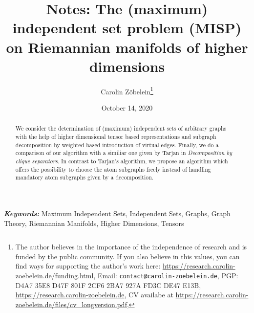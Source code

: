 \documentclass{article}
\newtheorem*{theorem A}{Theorem A}
\newtheorem*{theorem B}{N\"olker's Theorem}
\theoremstyle{remark}
\theoremstyle{remark}
\begin{document}
\title{Notes: The (maximum) independent set problem (MISP) on Riemannian manifolds of higher dimensions}
\author{Carolin Z\"obelein\thanks{The author believes in the importance of the independence of research and is funded by the public community. If you also believe in this values, you can find ways for supporting the author's work here: \url{https://research.carolin-zoebelein.de/funding.html}, Email: \href{mailto:contact@carolin-zoebelein.de}{\texttt{contact@carolin-zoebelein.de}}, PGP: D4A7 35E8 D47F 801F 2CF6 2BA7 927A FD3C DE47 E13B, \url{https://research.carolin-zoebelein.de}, CV availabe at \url{https://research.carolin-zoebelein.de/files/cv_longversion.pdf}, \Cooley}}
\date{October 14, 2020}   %
\maketitle
\begin{abstract}
    We consider the determination of (maximum) independent sets of arbitrary graphs with the help of higher dimensional tensor based representations and subgraph decomposition by weighted based introduction of virtual edges. Finally, we do a comparison of our algorithm with a similiar one given by Tarjan in \textit{Decomposition by clique separators}. In contrast to Tarjan's algorithm, we propose an algorithm which offers the possibility to choose the atom subgraphs freely instead of handling mandatory atom subgraphs given by a decomposition.
\end{abstract}
\providecommand{\keywords}[1]{\small{\textbf{\textit{Keywords:}} #1}}
\providecommand{\Classification}[1]{\small{\textbf{\textit{ACM Subject Classes:}} #1}}

\begin{flushleft}
    \keywords{Maximum Independent Sets, Independent Sets, Graphs, Graph Theory, Riemannian Manifolds, Higher Dimensions, Tensors}\\
\end{flushleft}
\tableofcontents
\end{document}
